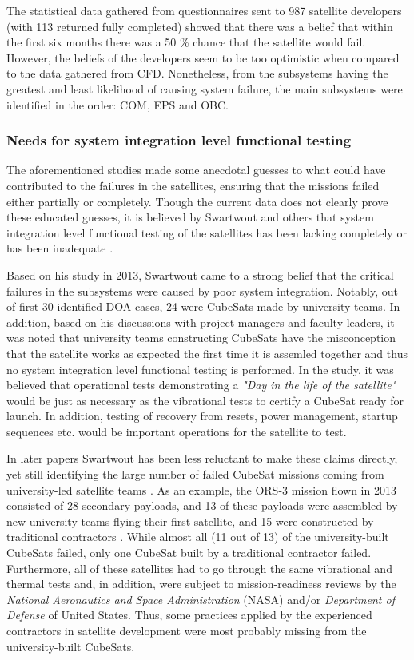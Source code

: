 \documentclass[english,12pt,a4paper,pdftex,elec,utf8]{aaltothesis}
\begin{document}
The statistical data gathered from questionnaires sent to 987 satellite developers (with 113 returned fully completed) showed that there was a belief that within the first six months there was a 50 \% chance that the satellite would fail. However, the beliefs of the developers seem to be too optimistic when compared to the data gathered from CFD. Nonetheless, from the subsystems having the greatest and least likelihood of causing system failure, the main subsystems were identified in the order: COM, EPS and OBC. \cite{Langer}\par
\subsubsection{Needs for system integration level functional testing}
The aforementioned studies made some anecdotal guesses to what could have contributed to the failures in the satellites, ensuring that the missions failed either partially or completely. Though the current data does not clearly prove these educated guesses, it is believed by Swartwout and others that system integration level functional testing of the satellites has been lacking completely or has been inadequate \cite{Swart2016, Langer, Swart1, Swart2015}. \par
Based on his study in 2013, Swartwout came to a strong belief that the critical failures in the subsystems were caused by poor system integration. Notably, out of first 30 identified DOA cases, 24 were CubeSats made by university teams. In addition, based on his discussions with project managers and faculty leaders, it was noted that university teams constructing CubeSats have the misconception that the satellite works as expected the first time it is assemled together and thus no system integration level functional testing is performed. In the study, it was believed that operational tests demonstrating a \textit{"Day in the life of the satellite"} would be just as necessary as the vibrational tests to certify a CubeSat ready for launch. In addition, testing of recovery from resets, power management, startup sequences etc. would be important operations for the satellite to test. \cite{Swart1} \par
In later papers Swartwout has been less reluctant to make these claims directly, yet still identifying the large number of failed CubeSat missions coming from university-led satellite teams \cite{Swart2016, Swart2015}. As an example, the ORS-3 mission flown in 2013 consisted of 28 secondary payloads, and 13 of these payloads were assembled by new university teams flying their first satellite, and 15 were constructed by traditional contractors \cite{Swart2016}. While almost all (11 out of 13) of the university-built CubeSats failed, only one CubeSat built by a traditional contractor failed. Furthermore, all of these satellites had to go through the same vibrational and thermal tests and, in addition, were subject to mission-readiness reviews by the \textit{National Aeronautics and Space Administration} (NASA) and/or \textit{Department of Defense} of United States. Thus, some practices applied by the experienced contractors in satellite development were most probably missing from the university-built CubeSats.\par
\end{document}
